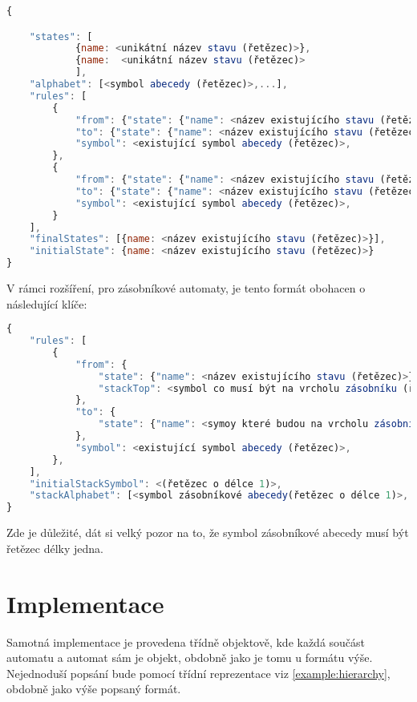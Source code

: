 \begin{lstlisting}[language=JavaScript,label={example:format}, caption={Přijímaný formát konečného automatu}]
{

    "states": [
    		{name: <unikátní název stavu (řetězec)>},
     		{name:  <unikátní název stavu (řetězec)>
     		],
    "alphabet": [<symbol abecedy (řetězec)>,...],
    "rules": [
        {
            "from": {"state": {"name": <název existujícího stavu (řetězec)>},},
            "to": {"state": {"name": <název existujícího stavu (řetězec)>}},
            "symbol": <existující symbol abecedy (řetězec)>,
        },
        {
            "from": {"state": {"name": <název existujícího stavu (řetězec)>},},
            "to": {"state": {"name": <název existujícího stavu (řetězec)>}},
            "symbol": <existující symbol abecedy (řetězec)>,
        }
    ],
    "finalStates": [{name: <název existujícího stavu (řetězec)>}],
    "initialState": {name: <název existujícího stavu (řetězec)>}
}

\end{lstlisting}

V rámci rozšíření, pro zásobníkové automaty, je tento formát obohacen o následující klíče:
\begin{lstlisting}[language=JavaScript,label={example:format}, caption={Rozšíření pro zásobníkový automat}]
{
	"rules": [
		{
			"from": {
				"state": {"name": <název existujícího stavu (řetězec)>},
				"stackTop": <symbol co musí být na vrcholu zásobníku (řetězec délky 1)>
			},
			"to": {
				"state": {"name": <symoy které budou na vrcholu zásobníku (řetězec délky 0-2)>}
			},
			"symbol": <existující symbol abecedy (řetězec)>,
		},
	],
	"initialStackSymbol": <(řetězec o délce 1)>,
	"stackAlphabet": [<symbol zásobníkové abecedy(řetězec o délce 1)>,...]
}

\end{lstlisting}

Zde je důležité, dát si velký pozor na to, že symbol zásobníkové abecedy musí být řetězec délky jedna. 

\section{Implementace}
Samotná implementace je provedena třídně objektově, kde každá součást automatu a automat sám je objekt, obdobně jako je tomu u formátu výše. Nejednoduší popsání bude pomocí třídní reprezentace viz \ref{example:hierarchy}, obdobně jako výše popsaný formát.


